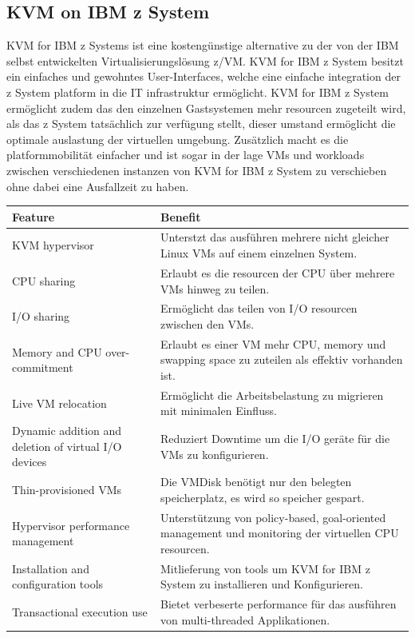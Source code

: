 \documentclass[14pt]{extreport}
\begin{document}
\newpage
\subsection{KVM on IBM z System}
KVM for IBM z Systems ist eine kostengünstige alternative zu der von der IBM selbst entwickelten Virtualisierungslösung z/VM. KVM for IBM z System besitzt ein einfaches und gewohntes User-Interfaces, welche eine einfache integration der z System platform in die IT infrastruktur ermöglicht.
KVM for IBM z System ermöglicht zudem das den einzelnen Gastsystemen mehr resourcen zugeteilt wird, als das z System tatsächlich zur verfügung stellt, dieser umstand ermöglicht die optimale auslastung der virtuellen umgebung. Zusätzlich macht es die platformmobilität einfacher und ist sogar in der lage VMs und workloads zwischen verschiedenen instanzen von KVM for IBM z System zu verschieben ohne dabei eine Ausfallzeit zu haben. \cite{website:ibm}
\begin{longtable}{|p{5cm}|p{10cm}|}
\hline
\textbf{Feature}                                     & \textbf{Benefit}                                                                                      \\ \hline
KVM hypervisor                                       & Unterstzt das ausführen mehrere nicht gleicher Linux VMs auf einem einzelnen System.                  \\ \hline
CPU sharing                                          & Erlaubt es die resourcen der CPU über mehrere VMs hinweg zu teilen.                                   \\ \hline
I/O sharing                                          & Ermöglicht das teilen von I/O resourcen zwischen den VMs.                                             \\ \hline
Memory and CPU over-commitment                       & Erlaubt es einer VM mehr CPU, memory und swapping space zu zuteilen als effektiv vorhanden ist.       \\ \hline
Live VM relocation                                   & Ermöglicht die Arbeitsbelastung zu migrieren mit minimalen Einfluss.                                  \\ \hline
Dynamic addition and deletion of virtual I/O devices & Reduziert Downtime um die I/O geräte für die VMs zu konfigurieren.                                    \\ \hline
Thin-provisioned VMs                                 & Die VMDisk benötigt nur den belegten speicherplatz, es wird so speicher gespart.                      \\ \hline
Hypervisor performance management                    & Unterstützung von policy-based, goal-oriented management und monitoring der virtuellen CPU resourcen. \\ \hline
Installation and configuration tools                 & Mitlieferung von tools um KVM for IBM z System zu installieren und Konfigurieren.                     \\ \hline
Transactional execution use                          & Bietet verbeserte performance für das ausführen von multi-threaded Applikationen.                     \\ \hline
\end{longtable}
\end{document}
